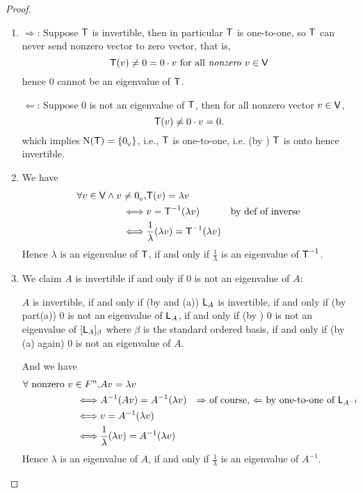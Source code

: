 \begin{proof} \ 

\begin{enumerate}
\item \(\Longrightarrow\): Suppose \(\textsf{T}\) is invertible,
then in particular \(\textsf{T}\) is one-to-one, so \(\textsf{T}\) can never send nonzero vector to zero vector,
that is,
\[
    \textsf{T}(v) \ne 0 = 0 \cdot v \text{ for all \emph{nonzero} \(v \in \textsf{V}\)}
\]
hence \(0\) cannot be an eigenvalue of \(\textsf{T}\).

\(\Longleftarrow\): Suppose \(0\) is not an eigenvalue of \(\textsf{T}\), then for all nonzero vector \(v \in \textsf{V}\),
\[
    \textsf{T}(v) \ne 0 \cdot v = 0.
\]
which implies \(\mathrm{N}(\textsf{T}) = \{ 0_{_{\textsf{V}}} \}\), i.e., \(\textsf{T}\) is one-to-one, i.e. (by ) \(\textsf{T}\) is onto hence invertible.

\item We have
\begin{align*}
    \forall v \in \textsf{V} \land v \ne 0_{_{\textsf{V}}}, 
         & \textsf{T}(v) = \lambda v \\
    \iff & v = \textsf{T}^{-1}(\lambda v) & \text{by def of inverse} \\
    \iff & \frac{1}{\lambda} (\lambda v) = \textsf{T}^{-1}(\lambda v)
\end{align*}
Hence \(\lambda\) is an eigenvalue of \(\textsf{T}\), if and only if \(\frac{1}{\lambda}\) is an eigenvalue of \(\textsf{T}^{-1}\).

\item We claim \(A\) is invertible if and only if \(0\) is not an eigenvalue of \(A\):

\(A\) is invertible, if and only if (by  and (a)) \(\textsf{L}_A\) is invertible, if and only if (by part(a)) \(0\) is not an eigenvalue of \(\textsf{L}_A\), if and only if (by ) \(0\) is not an eigenvalue of \([\textsf{L}_A]_{\beta}\) where \(\beta\) is the standard ordered basis, if and only if (by (a) again) \(0\) is not an eigenvalue of \(A\).

And we have
\begin{align*}
    \forall \text{ nonzero } v \in F^n, 
         & Av = \lambda v \\
    \iff & A^{-1}(Av) = A^{-1}(\lambda v) & \text{\(\Rightarrow\) of course, \(\Leftarrow\) by one-to-one of \(\textsf{L}_{A^{-1}}\)} \\
    \iff & v = A^{-1}(\lambda v) \\
    \iff & \frac{1}{\lambda} (\lambda v) = A^{-1}(\lambda v)
\end{align*}
Hence \(\lambda\) is an eigenvalue of \(A\), if and only if \(\frac{1}{\lambda}\) is an eigenvalue of \(A^{-1}\).
\end{enumerate}
\end{proof}

